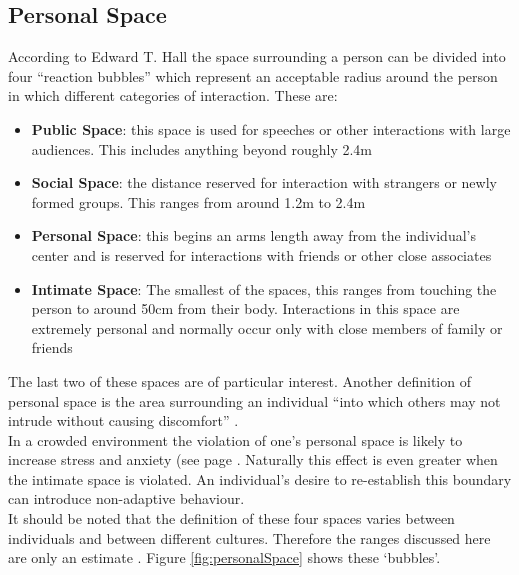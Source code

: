 \subsection{Personal Space}
\label{Res:subsec:personalSpace}
According to Edward T. Hall \cite{HiddenDimension} the space surrounding a person can be divided into four ``reaction bubbles'' which represent an acceptable radius around the person in which different categories of interaction. These are:
\begin{itemize}
  \item{\textbf{Public Space}: this space is used for speeches or other interactions with large audiences. This includes anything beyond roughly 2.4m}
  \item{\textbf{Social Space}: the distance reserved for interaction with strangers or newly formed groups. This ranges from around 1.2m to 2.4m}
  \item{\textbf{Personal Space}: this begins an arms length away from the individual's center and is reserved for interactions with friends or other close associates}
  \item{\textbf{Intimate Space}: The smallest of the spaces, this ranges from touching the person to around 50cm from their body. Interactions in this space are extremely personal and normally occur only with close members of family or friends}
\end{itemize}
The last two of these spaces are of particular interest. Another definition of personal space is the area surrounding an individual ``into which others may not intrude without causing discomfort'' \cite[pg. 424]{HandbookOfPsychology5}.\\
In a crowded environment the violation of one's personal space is likely to increase stress and anxiety (see page \pageref{Res:subsec:personalSpace}. Naturally this effect is even greater when the intimate space is violated. An individual's desire to re-establish this boundary can introduce non-adaptive behaviour.\\
It should be noted that the definition of these four spaces varies between individuals and between different cultures. Therefore the ranges discussed here are only an estimate \cite{ProxemicsWiki}. Figure \ref{fig:personalSpace} shows these `bubbles'.

